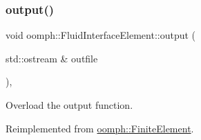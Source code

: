 \mbox{\label{classoomph_1_1FluidInterfaceElement_aba83fbd0679ffca4ef6aa32f7aa5d179}} 
\subsubsection{\texorpdfstring{output()}{output()}\hspace{0.1cm}{\footnotesize\ttfamily [1/4]}}
{\footnotesize\ttfamily void oomph\+::\+Fluid\+Interface\+Element\+::output (\begin{DoxyParamCaption}\item[{std\+::ostream \&}]{outfile }\end{DoxyParamCaption})\hspace{0.3cm}{\ttfamily [inline]}, {\ttfamily [virtual]}}



Overload the output function. 



Reimplemented from \hyperlink{classoomph_1_1FiniteElement_a2ad98a3d2ef4999f1bef62c0ff13f2a7}{oomph\+::\+Finite\+Element}.



